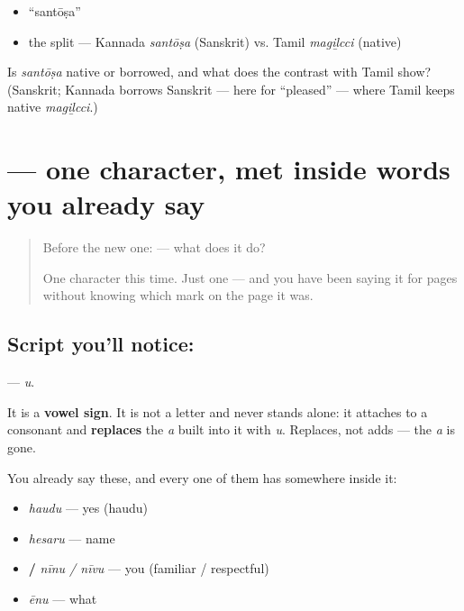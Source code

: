 \begin{itemize}
\raggedright
  \item \textquotedblleft{}santōṣa\textquotedblright{}
  \item the split — Kannada \emph{santōṣa} (Sanskrit) vs. Tamil \emph{magiḻcci} (native)
\end{itemize}

\begin{tcolorbox}[breakable,colback=teal!4,colframe=teal!35!black,title={Before you move on}]
Is \emph{santōṣa} native or borrowed, and what does the contrast with Tamil show? (Sanskrit; Kannada borrows Sanskrit — here for \textquotedblleft{}pleased\textquotedblright{} — where Tamil keeps native \emph{magiḻcci}.)
\end{tcolorbox}
\section[\texorpdfstring{\kn{ು} (u)}{ು (u)}]{ — one character, met inside words you already say}

\label{lesson:KA-S02-vowel-sign-u}



\begin{quote}
Before the new one:  — what does it do?

One character this time. Just one — and you have been saying it for pages without knowing which mark on the page it was.
\end{quote}

\subsection*{Script you'll notice: }
\textbf{} — \emph{u}.

It is a \textbf{vowel sign}. It is not a letter and never stands alone: it attaches to a consonant and \textbf{replaces} the \emph{a} built into it with \emph{u}. Replaces, not adds — the \emph{a} is gone.

You already say these, and every one of them has  somewhere inside it:

\begin{itemize}
\raggedright
  \item \textbf{} \emph{haudu} — yes (haudu)
  \item \textbf{} \emph{hesaru} — name
  \item \textbf{ / } \emph{nīnu / nīvu} — you (familiar / respectful)
  \item \textbf{} \emph{ēnu} — what
\end{itemize}

